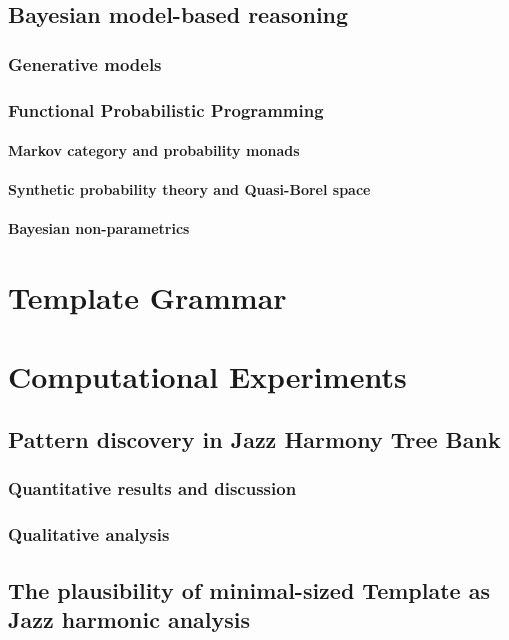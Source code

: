 \chapter{Bayesian model-based reasoning}
    \section{Generative models}
    \section{Functional Probabilistic Programming}
        \subsection{Markov category and probability monads}
        \subsection{Synthetic probability theory and Quasi-Borel space}
        \subsection{Bayesian non-parametrics}




%
\cleardoublepage
\part{Template Grammar}
% 


    

\cleardoublepage
\part{Computational Experiments}
\chapter{Pattern discovery in Jazz Harmony Tree Bank}
    \section{Quantitative results and discussion}
    \section{Qualitative analysis}
\chapter{The plausibility of minimal-sized Template as Jazz harmonic analysis}
